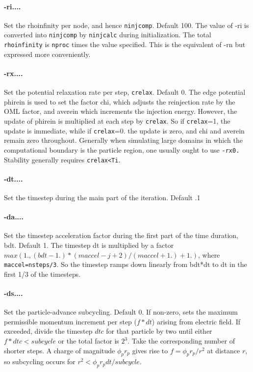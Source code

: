 \documentclass[12pt]{article}
\begin{document}
\paragraph{-ri....} Set the rhoinfinity per node, and hence
\verb!ninjcomp!. Default 100. 
The value of -ri is converted into \verb!ninjcomp! by \verb!ninjcalc! during
initialization. The total \verb!rhoinfinity! is \verb!nproc! times the value
specified. This is the equivalent of -rn but expressed more conveniently.

\paragraph{-rx....} 
Set the potential relaxation rate per step, \verb!crelax!. Default 0.
The edge potential phirein is used to set the factor chi, which
adjusts the reinjection rate by the OML factor, and averein which
increments the injection energy. However, the update of phirein is
multiplied at each step by \verb!crelax!. So if \verb!crelax!=1, the update is
immediate, while if \verb!crelax!=0. the update is zero, and chi and averein
remain zero throughout. Generally when simulating large domains in
which the computational boundary is the particle region, one usually
ought to use \verb!-rx0.! Stability generally requires \verb!crelax<Ti!.

\paragraph{-dt....}
 Set the timestep during the main part of the iteration. Default .1

\paragraph{-da....}
 Set the timestep acceleration factor during the first part of
 the time duration, bdt. Default 1. The timestep dt is multiplied by a
 factor $max(1.,(bdt-1.)*(maccel-j+2)/(maccel+1.)+1.)$, where
 \verb!maccel=nsteps/3!.  So the timestep ramps down linearly from bdt*dt to
 dt in the first 1/3 of the timesteps.

\paragraph{-ds....}
Set the particle-advance subcycling. Default 0.  If non-zero, sets the
maximum permissible momentum increment per step ($f*dt$) arising from
electric field. If exceeded, divide the timestep $dtc$ for that
particle by two until either $f*dtc<subcycle$ or the total factor is
$2^3$. Take the corresponding number of shorter steps. A charge of
magnitude $\phi_pr_p$ gives rise to $f=\phi_pr_p/r^2$ at distance $r$,
so subcycling occurs for $r^2<\phi_pr_pdt/subcycle$.
\end{document}

